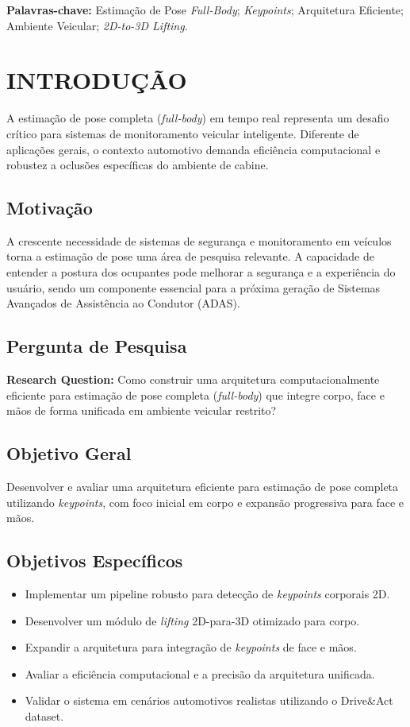 \documentclass[12pt, a4paper]{article}
\begin{document}
\vspace{0.5cm}
\noindent\textbf{Palavras-chave:} Estimação de Pose \textit{Full-Body}; \textit{Keypoints}; Arquitetura Eficiente; Ambiente Veicular; \textit{2D-to-3D Lifting}.

\section{INTRODUÇÃO}
A estimação de pose completa (\textit{full-body}) em tempo real representa um
desafio crítico para sistemas de monitoramento veicular inteligente. Diferente
de aplicações gerais, o contexto automotivo demanda eficiência computacional e
robustez a oclusões específicas do ambiente de cabine.

\subsection{Motivação}
A crescente necessidade de sistemas de segurança e monitoramento em veículos
torna a estimação de pose uma área de pesquisa relevante. A capacidade de
entender a postura dos ocupantes pode melhorar a segurança e a experiência do
usuário, sendo um componente essencial para a próxima geração de Sistemas
Avançados de Assistência ao Condutor (ADAS).

\subsection{Pergunta de Pesquisa}
\textbf{Research Question:} Como construir uma arquitetura computacionalmente eficiente para estimação de pose completa (\textit{full-body}) que integre corpo, face e mãos de forma unificada em ambiente veicular restrito?

\subsection{Objetivo Geral}
Desenvolver e avaliar uma arquitetura eficiente para estimação de pose completa
utilizando \textit{keypoints}, com foco inicial em corpo e expansão progressiva
para face e mãos.

\subsection{Objetivos Específicos}
\begin{itemize}
    \item Implementar um pipeline robusto para detecção de \textit{keypoints} corporais
          2D.
    \item Desenvolver um módulo de \textit{lifting} 2D-para-3D otimizado para corpo.
    \item Expandir a arquitetura para integração de \textit{keypoints} de face e mãos.
    \item Avaliar a eficiência computacional e a precisão da arquitetura unificada.
    \item Validar o sistema em cenários automotivos realistas utilizando o Drive\&Act
          dataset.
\end{itemize}
\end{document}
